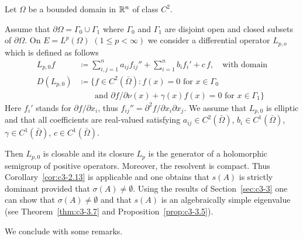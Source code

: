 \begin{example}\label{ex:c3-2.14}
	Let $\Omega$ be a bounded domain in $\mathbb{R} ^{n}$ of class $C^{2}$.
	
	Assume that $\partial\Omega = \Gamma_{0}\cup\Gamma_{1}$ where $\Gamma_{0}$ and $\Gamma_{1}$ are disjoint open and closed subsets of\/ $\partial\Omega$.
    On $E = L^{p}(\Omega)$ $(1 \leq p < \infty)$ we consider a differential operator $L_{p,o}$ which is defined as follows
\begin{equation}\label{eq:c3-2.23}
    \begin{split}
        L_{p,0}f &\coloneq \sum_{i,j=1}^{n} a_{ij} f_{ij}'' 
                  + \sum_{i=1}^{n} b_{i} f_{i}' + c\,f, 
                  \quad \text{with domain} \\
        D(L_{p,0}) &\coloneq \{f \in C^{2}(\bar{\Omega}) \colon 
                    f(x) = 0 \text{ for } x \in \Gamma_{0} \\
                   &\phantom{\coloneqq\{} \text{and } 
                    \partial f/\partial\nu(x) + \gamma(x)f(x) = 0 
                    \text{ for } x \in \Gamma_{1}\}
    \end{split}
\end{equation}
Here $f_{i}'$ stands for $\partial f/\partial x_{i}$, thus $f_{ij}'' = \partial^{2}f/\partial x_{i}\partial x_{j}$.
We assume that $L_{p,0}$ is elliptic and that all coefficients are real-valued satisfying $a_{ij} \in C^{2}(\bar{\Omega})$, $b_{i} \in C^{1}(\bar{\Omega})$, $\gamma \in C^{1}(\bar{\Omega})$, $c \in C^{1}(\bar{\Omega})$.

Then $L_{p,0}$ is closable and its closure $L_{p}$ is the generator of a holomorphic semigroup of positive operators.
Moreover, the resolvent is compact.
Thus Corollary~\ref{cor:c3-2.13} is applicable and one obtains that $s(A)$ is strictly dominant provided that $\sigma(A) \neq \emptyset$.
Using the results of Section~\ref{sec:c3-3} one can show that $\sigma(A) \neq \emptyset$ and that $s(A)$ is an algebraically simple eigenvalue (see Theorem~\ref{thm:c3-3.7} and Proposition~\ref{prop:c3-3.5}).
\end{example}
We conclude with some remarks.
